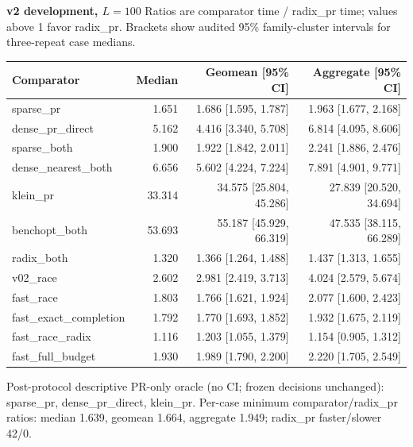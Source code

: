 \par\noindent\textbf{v2 development, $L=100$}
Ratios are comparator time / radix\_pr time; values above 1 favor radix\_pr.
Brackets show audited 95\% family-cluster intervals for three-repeat case medians.
\par\smallskip
\begin{tabular}{lrrr}
Comparator & Median & Geomean [95\% CI] & Aggregate [95\% CI] \\
\hline
sparse\_pr & 1.651 & 1.686 [1.595, 1.787] & 1.963 [1.677, 2.168] \\
dense\_pr\_direct & 5.162 & 4.416 [3.340, 5.708] & 6.814 [4.095, 8.606] \\
sparse\_both & 1.900 & 1.922 [1.842, 2.011] & 2.241 [1.886, 2.476] \\
dense\_nearest\_both & 6.656 & 5.602 [4.224, 7.224] & 7.891 [4.901, 9.771] \\
klein\_pr & 33.314 & 34.575 [25.804, 45.286] & 27.839 [20.520, 34.694] \\
benchopt\_both & 53.693 & 55.187 [45.929, 66.319] & 47.535 [38.115, 66.289] \\
radix\_both & 1.320 & 1.366 [1.264, 1.488] & 1.437 [1.313, 1.655] \\
v02\_race & 2.602 & 2.981 [2.419, 3.713] & 4.024 [2.579, 5.674] \\
fast\_race & 1.803 & 1.766 [1.621, 1.924] & 2.077 [1.600, 2.423] \\
fast\_exact\_completion & 1.792 & 1.770 [1.693, 1.852] & 1.932 [1.675, 2.119] \\
fast\_race\_radix & 1.116 & 1.203 [1.055, 1.379] & 1.154 [0.905, 1.312] \\
fast\_full\_budget & 1.930 & 1.989 [1.790, 2.200] & 2.220 [1.705, 2.549] \\
\end{tabular}
\par\smallskip
Post-protocol descriptive PR-only oracle (no CI; frozen decisions unchanged): sparse\_pr, dense\_pr\_direct, klein\_pr.
Per-case minimum comparator/radix\_pr ratios: median 1.639, geomean 1.664, aggregate 1.949; radix\_pr faster/slower 42/0.

